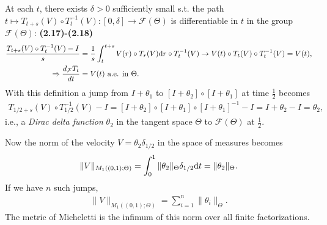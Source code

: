 \documentclass{book}
\numberwithin{equation}{section}
\begin{document}
\begin{enumerate}
    At each $t$, there exists $\delta > 0$ sufficiently small s.t. the path $t\mapsto T_{t+s}(V)\circ T_t^{-1}(V):[0,\delta]\to\mathcal{F}(\Theta)$ is differentiable in $t$ in the group $\mathcal{F}(\Theta)$: \textbf{(2.17)-(2.18)}
    \begin{align*}
        \frac{T_{t+s}(V)\circ T_t^{-1}(V) - I}{s} &= \frac{1}{s}\int_t^{t+s} V(r)\circ T_r(V){\rm d}r\circ T_t^{-1}(V)\to V(t)\circ T_t(V)\circ T_t^{-1}(V) = V(t),\\
        \Rightarrow\frac{d_{\mathcal{F}}T_t}{dt} &= V(t) \mbox{ a.e. in } \Theta.
    \end{align*}
    With this definition a jump from $I + \theta_1$ to $[I + \theta_2]\circ[I + \theta_1]$ at time $\frac{1}{2}$ becomes
    \begin{align*}
        T_{1/2 + s}(V)\circ T_{1/2}^{-1}(V) - I = [I + \theta_2]\circ[I + \theta_1]\circ[I + \theta_1]^{-1} - I = I + \theta_2 - I = \theta_2,
    \end{align*}
    i.e., a \textit{Dirac delta function} $\theta_2$ in the tangent space $\Theta$ to $\mathcal{F}(\Theta)$ at $\frac{1}{2}$.
    
    Now the norm of the velocity $V = \theta_2\delta_{1/2}$ in the space of measures becomes
    \begin{align*}
        \|V\|_{M_1\left((0,1);\Theta\right)} = \int_0^1 \|\theta_2\|_\Theta\delta_{1/2}{\rm d}t = \|\theta_2\|_\Theta.
    \end{align*}
    If we have $n$ such jumps,
    \begin{align*}
        \|V\|_{M_1\left((0,1);\Theta\right)} = \sum_{i=1}^n \|\theta_i\|_\Theta.
    \end{align*}
    The metric of Micheletti is the infimum of this norm over all finite factorizations.
    

\end{enumerate}
\end{document}
